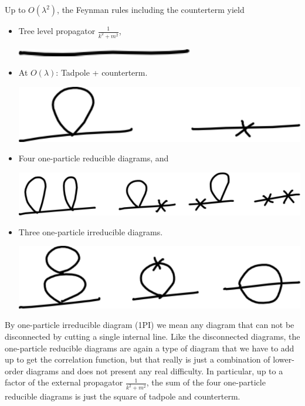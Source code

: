Up to $O(\lambda^2)$, the Feynman rules including the counterterm
yield
\begin{itemize}
\item Tree level propagator $\frac{1}{k^2+m^2}$,
  \begin{center}
    \includegraphics[scale=0.7]{figures/draw-propagator-tree.pdf}
  \end{center}
\item At $O(\lambda)$: Tadpole + counterterm.
  \begin{center}
    \includegraphics[scale=0.7]{figures/draw-propagator-tadpole_and_counterterm.pdf}
  \end{center}
\item Four one-particle reducible diagrams, and
  \begin{center}
    \includegraphics[scale=0.7]{figures/draw-propagator-twoloop_reducible.pdf}
  \end{center}
\item Three one-particle irreducible diagrams.
  \begin{center}
    \includegraphics[scale=0.7]{figures/draw-propagator-twoloop_1PI.pdf}
  \end{center}
\end{itemize}
By one-particle irreducible diagram (1PI) we mean any diagram that can
not be disconnected by cutting a single internal line. Like the
disconnected diagrams, the one-particle reducible diagrams are again a
type of diagram that we have to add up to get the correlation
function, but that really is just a combination of lower-order
diagrams and does not present any real difficulty. In particular, up
to a factor of the external propagator $\frac{1}{k^2+m^2}$, the sum of
the four one-particle reducible diagrams is just the square of tadpole
and counterterm.

